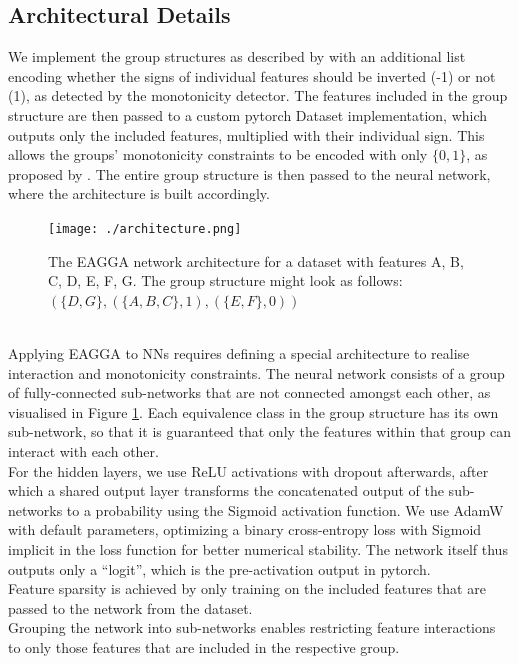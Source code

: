 \documentclass[twoside,11pt]{article}
\begin{document}
\subsection{Architectural Details}
We implement the group structures as described by \citet[p. 541]{EAGGA} with an additional list encoding whether the signs of individual features should
be inverted (-1) or not (1), as detected by the monotonicity detector.
The features included in the group structure are then passed to a custom pytorch Dataset implementation, which outputs only the included features, multiplied with their
individual sign. This allows the groups' monotonicity constraints to be encoded with only $\{0,1\}$, as proposed by \citet[p. 543]{EAGGA}.
The entire group structure is then passed to the neural network, where the architecture is built accordingly.
\begin{figure}
  \centering
  \texttt{[image: ./architecture.png]}  %
  \caption{The EAGGA network architecture for a dataset with features A, B, C, D, E, F, G. The group structure might look as follows: $(\{D,G\}, (\{A,B,C\}, 1), (\{E,F\}, 0))$}
  \label{fig-nn-architecture}
\end{figure}
\\
Applying EAGGA to NNs requires defining a special architecture to realise interaction and monotonicity constraints.
The neural network consists of a group of fully-connected sub-networks that are not connected amongst each other, as visualised in Figure \ref{fig-nn-architecture}.
Each equivalence class in the group structure has its own sub-network, so that it is guaranteed that only the features within that group can interact with each other.
\\
For the hidden layers, we use ReLU activations with dropout afterwards, after which a shared output layer transforms the concatenated output of the sub-networks
to a probability using the Sigmoid activation function.
We use AdamW with default parameters, optimizing a binary cross-entropy loss with Sigmoid implicit in the loss function for better numerical stability. The network
itself thus outputs only a ``logit'', which is the pre-activation output in pytorch.
\\
Feature sparsity is achieved by only training on the included features that are passed to the network from the dataset.
\\
Grouping the network into sub-networks enables restricting feature interactions to only those features that are included in the respective group.
\end{document}
